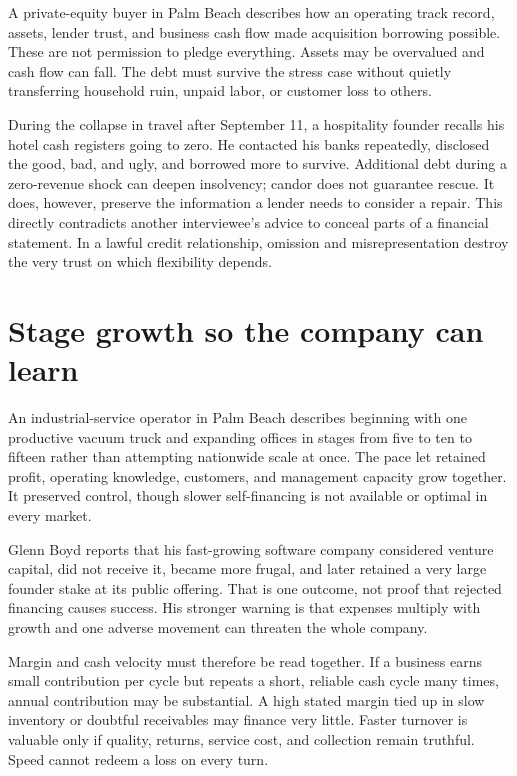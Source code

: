 A private-equity buyer in Palm Beach describes how an operating track record,
assets, lender trust, and business cash flow made acquisition borrowing
possible. These are not permission to pledge everything. Assets may be
overvalued and cash flow can fall. The debt must survive the stress case without
quietly transferring household ruin, unpaid labor, or customer loss to others.

During the collapse in travel after September 11, a hospitality founder recalls
his hotel cash registers going to zero. He contacted his banks repeatedly, disclosed
the good, bad, and ugly, and borrowed more to survive. Additional debt during a
zero-revenue shock can deepen insolvency; candor does not guarantee rescue. It
does, however, preserve the information a lender needs to consider a repair.
This directly contradicts another interviewee's advice to conceal parts of a
financial statement. In a lawful credit relationship, omission and
misrepresentation destroy the very trust on which flexibility depends.

\section{Stage growth so the company can learn}

An industrial-service operator in Palm Beach describes beginning with one
productive vacuum truck and expanding offices in stages from five to ten to
fifteen rather than attempting nationwide scale at once. The pace let retained
profit, operating knowledge, customers, and management capacity grow together.
It preserved control, though slower self-financing is not available or optimal
in every market.

Glenn Boyd reports that his fast-growing software company considered venture
capital, did not receive it, became more frugal, and later retained a very large
founder stake at its public offering. That is one outcome, not proof that
rejected financing causes success. His stronger warning is that expenses
multiply with growth and one adverse movement can threaten the whole company.

Margin and cash velocity must therefore be read together. If a business earns
small contribution per cycle but repeats a short, reliable cash cycle many
times, annual contribution may be substantial. A high stated margin tied up in
slow inventory or doubtful receivables may finance very little. Faster turnover
is valuable only if quality, returns, service cost, and collection remain
truthful. Speed cannot redeem a loss on every turn.

